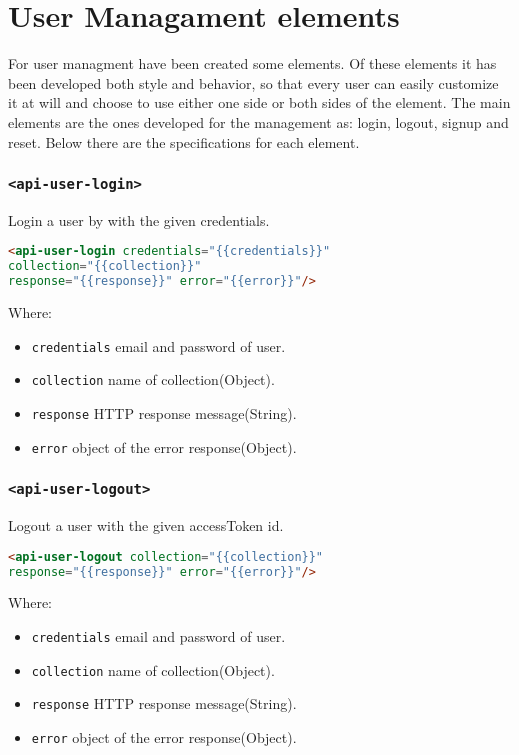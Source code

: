 \section{User Managament elements}

For user managment have been created some elements.
Of these elements it has been developed both style and behavior, so that every user can easily customize it at will and choose to use either one side or both sides of the element.
The main elements are the ones developed for the management as: login, logout, signup and reset.
Below there are the specifications for each element.

\subsubsection{\texttt{<api-user-login>}}

Login a user by with the given credentials.
\begin{lstlisting}[language=html]
<api-user-login credentials="{{credentials}}"
collection="{{collection}}" 
response="{{response}}" error="{{error}}"/>
\end{lstlisting}
Where:
\begin{itemize}
\item \texttt{credentials} email and password of user.
\item \texttt{collection} name of collection(Object).
\item \texttt{response}	HTTP response message(String).
\item \texttt{error} object of the error response(Object).
\end{itemize}

\subsubsection{\texttt{<api-user-logout>}}

Logout a user with the given accessToken id.
\begin{lstlisting}[language=html]
<api-user-logout collection="{{collection}}" 
response="{{response}}" error="{{error}}"/>
\end{lstlisting}
Where:
\begin{itemize}
\item \texttt{credentials} email and password of user.
\item \texttt{collection} name of collection(Object).
\item \texttt{response}	HTTP response message(String).
\item \texttt{error} object of the error response(Object).
\end{itemize}

